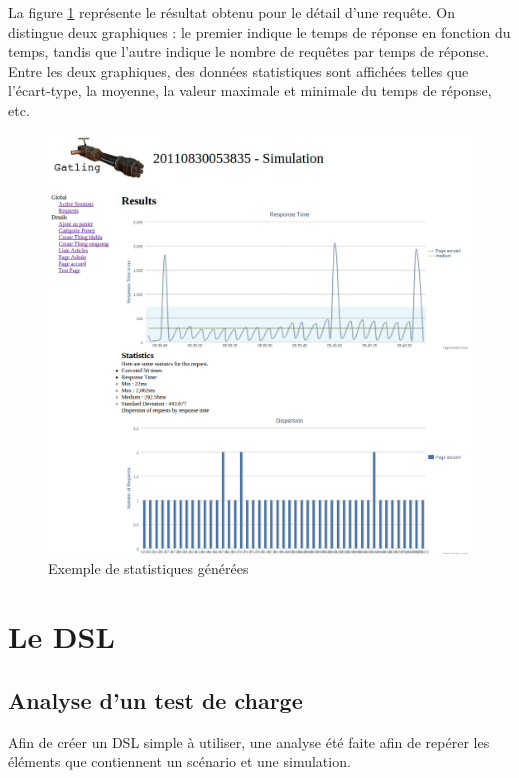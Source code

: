 La figure \ref{stats_exp} représente le résultat obtenu pour le détail d'une requête. On distingue deux graphiques : le premier indique le temps de réponse en fonction du temps, tandis que l'autre indique le nombre de requêtes par temps de réponse. Entre les deux graphiques, des données statistiques sont affichées telles que l'écart-type, la moyenne, la valeur maximale et minimale du temps de réponse, etc.

\begin{figure}[h]
\begin{center}
\includegraphics{img/stats_exp.png}
\end{center}
\caption{Exemple de statistiques générées}
\label{stats_exp}
\end{figure}

\section{Le DSL}
\subsection{Analyse d'un test de charge}
Afin de créer un DSL simple à utiliser, une analyse été faite afin de repérer les éléments que contiennent un scénario et une simulation.

